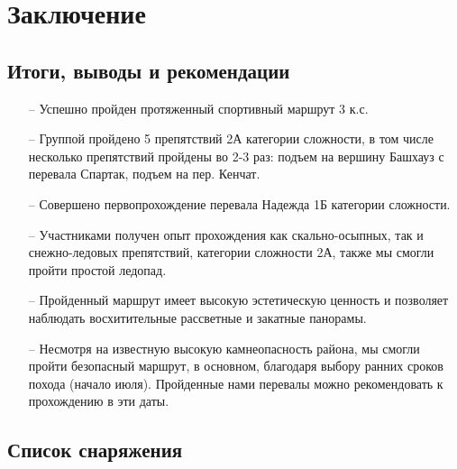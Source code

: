 \section{Заключение}\label{sec:conclusions}
	\subsection{Итоги, выводы и рекомендации}
		\begin{itemize}
			\item[--] Успешно пройден протяженный спортивный маршрут 3 к.с.
			\item[--] Группой пройдено 5 препятствий 2А категории сложности, в том числе несколько препятствий пройдены во 2-3 раз: подъем на вершину Башхауз с перевала Спартак, подъем на пер. Кенчат.
			\item[--] Совершено первопрохождение перевала Надежда 1Б категории сложности.
			\item[--] Участниками получен опыт прохождения как скально-осыпных, так и снежно-ледовых препятствий, категории сложности 2А, также мы смогли пройти простой ледопад.
			\item[--] Пройденный маршрут имеет высокую эстетическую ценность и позволяет наблюдать восхитительные рассветные и закатные панорамы.
			\item[--] Несмотря на известную высокую камнеопасность района, мы смогли пройти безопасный маршрут, в основном, благодаря выбору ранних сроков похода (начало июля). Пройденные нами перевалы можно рекомендовать к прохождению в эти даты.
		\end{itemize}
			
	\subsection{Список снаряжения}
		\setlength{\arrayrulewidth}{0.2mm}
		\setlength{\tabcolsep}{0pt}
		\renewcommand{\arraystretch}{1}

